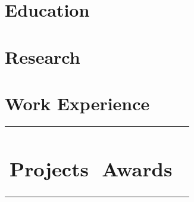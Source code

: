 \documentclass{cv}
\begin{document}

    \section{Education}
        

    \section{Research}
        
    
    \section{Work Experience}
        
        

    \hspace*{-0.9cm}
    \begin{tabular}{p{0.488\linewidth}p{0.488\linewidth}}
        \section{Projects}
            
            
            
        
        &

        \section{Awards}
            
            
            
    \end{tabular}
\end{document}
